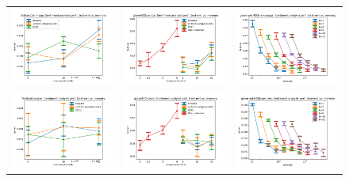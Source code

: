 \begin{figure}
	\centering
	\begin{tabular} {c c c}
	\includegraphics[width=0.28\linewidth]{figures/fasttext1m_mpqa_test-err_vs_compression.pdf} &
	\includegraphics[width=0.28\linewidth]{figures/glove400k_mpqa_test-err_vs_compression.pdf} &
	\includegraphics[width=0.28\linewidth]{figures/glove-wiki400k-am_mpqa_test-err_vs_compression.pdf} \\[-0.5em]
	\includegraphics[width=0.28\linewidth]{figures/fasttext1m_trec_test-err_vs_compression.pdf} &
	\includegraphics[width=0.28\linewidth]{figures/glove400k_trec_test-err_vs_compression.pdf} &
	\includegraphics[width=0.28\linewidth]{figures/glove-wiki400k-am_trec_test-err_vs_compression.pdf} \\[-0.5em]

\end{tabular}
\end{figure}
